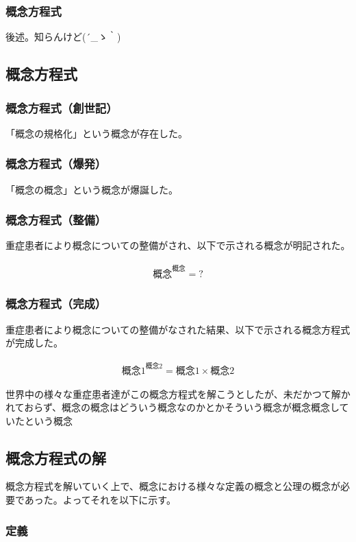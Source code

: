 \documentclass[12pt]{jsarticle}
\begin{document}
\subsubsection{概念方程式}
後述。知らんけど\sf(´\_ゝ｀)

\newpage
\subsection{概念方程式}
\subsubsection{概念方程式（創世記）}
「概念の規格化」という概念が存在した。

\subsubsection{概念方程式（爆発）}
「概念の概念」という概念が爆誕した。

\subsubsection{概念方程式（整備）}
重症患者により概念についての整備がされ、以下で示される概念が明記された。

\begin{eqnarray}
{概念}^{概念}=?
\end{eqnarray}

\subsubsection{概念方程式（完成）}
重症患者により概念についての整備がなされた結果、以下で示される概念方程式が完成した。


\begin{eqnarray}
{概念1}^{概念2}={概念1}\times{概念2}
\end{eqnarray}

世界中の様々な重症患者達がこの概念方程式を解こうとしたが、未だかつて解かれておらず、概念の概念はどういう概念なのかとかそういう概念が概念概念していたという概念

\newpage
\subsection{概念方程式の解}
概念方程式を解いていく上で、概念における様々な定義の概念と公理の概念が必要であった。よってそれを以下に示す。

\subsubsection{定義}
\end{document}

